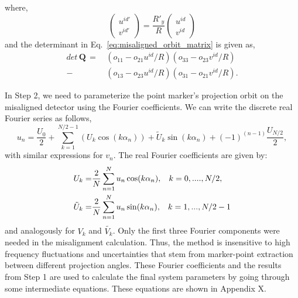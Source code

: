 %
where, 
%
\begin{equation}
\begin{pmatrix}
u^{id'} \\
v^{id'}
\end{pmatrix} = \frac{R'_y}{R}
\begin{pmatrix}
u^{id}\\
v^{id}
\end{pmatrix}
\end{equation}
%
and the determinant in Eq.~\ref{eq:misaligned_orbit_matrix} is given as,
%
\begin{equation}
\begin{aligned}
det \, \mathrm{\mathbf{Q}} \, = \, &(o_{11} - o_{21} u^{id}/R) (o_{33} - o_{23} v^{id}/R) \\
                           - &(o_{13} - o_{23} u^{id}/R) (o_{31} - o_{21} v^{id}/R ).
\end{aligned}
\label{eq:detQ}
\end{equation}

In Step 2, we need to parameterize the point marker's projection orbit on the misaligned detector using the Fourier coefficients.  We can write the discrete real Fourier series as follows, 
%
\begin{equation}\label{eq:fourierseries}
u_n = \frac{U_0}{2} + \sum ^{N/2-1}_{k=1} (U_k \cos (k\alpha_n)) + \tilde{U}_k \sin (k \alpha_n) + (-1)^{(n-1)} \frac{U_{N/2}}{2}, 
\end{equation}
%
with similar expressions for $v_n$.  The real Fourier coefficients are given by:
%
\begin{equation}\label{eq:fouriercoeff}
\begin{split}
U_k = & \frac{2}{N}\sum_{n=1}^{N} u_n \cos (k \alpha_n), \hspace{0.3cm} k = 0, ...., N/2, \\
\tilde{U}_k = & \frac{2}{N} \sum_{n=1}^{N} u_n \sin (k \alpha_n), \hspace{0.3cm} k = 1,...,N/2-1
\end{split}
\end{equation}
%
and analogously for $V_k$ and $\tilde{V_k}$.  Only the first three Fourier components were needed in the misalignment calculation.  Thus, the method is insensitive to high frequency fluctuations and uncertainties that stem from marker-point extraction between different projection angles.  These Fourier coefficients and the results from Step 1 are used to calculate the final system parameters by going through some intermediate equations.  These equations are shown in Appendix X.

